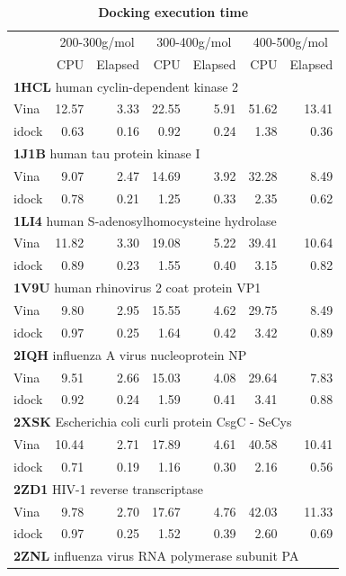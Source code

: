 \begin{table}[!ht]
\caption{
\bf{Docking execution time}}
\begin{tabular}{lrrrrrr}
\hline
& \multicolumn{2}{c}{200-300g/mol} & \multicolumn{2}{c}{300-400g/mol} & \multicolumn{2}{c}{400-500g/mol}\\
& CPU & Elapsed & CPU & Elapsed & CPU & Elapsed\\
\hline
\multicolumn{7}{l}{\textbf{1HCL} human cyclin-dependent kinase 2}\\
Vina  & 12.57 &  3.33 & 22.55 &  5.91 & 51.62 & 13.41\\
idock &  0.63 &  0.16 &  0.92 &  0.24 &  1.38 &  0.36\\
\multicolumn{7}{l}{\textbf{1J1B} human tau protein kinase I}\\
Vina  &  9.07 &  2.47 & 14.69 &  3.92 & 32.28 &  8.49\\
idock &  0.78 &  0.21 &  1.25 &  0.33 &  2.35 &  0.62\\
\multicolumn{7}{l}{\textbf{1LI4} human S-adenosylhomocysteine hydrolase}\\
Vina  & 11.82 &  3.30 & 19.08 &  5.22 & 39.41 & 10.64\\
idock &  0.89 &  0.23 &  1.55 &  0.40 &  3.15 &  0.82\\
\multicolumn{7}{l}{\textbf{1V9U} human rhinovirus 2 coat protein VP1}\\
Vina  &  9.80 &  2.95 & 15.55 &  4.62 & 29.75 &  8.49\\
idock &  0.97 &  0.25 &  1.64 &  0.42 &  3.42 &  0.89\\
\multicolumn{7}{l}{\textbf{2IQH} influenza A virus nucleoprotein NP}\\
Vina  &  9.51 &  2.66 & 15.03 &  4.08 & 29.64 &  7.83\\
idock &  0.92 &  0.24 &  1.59 &  0.41 &  3.41 &  0.88\\
\multicolumn{7}{l}{\textbf{2XSK} Escherichia coli curli protein CsgC - SeCys}\\
Vina  & 10.44 &  2.71 & 17.89 &  4.61 & 40.58 & 10.41\\
idock &  0.71 &  0.19 &  1.16 &  0.30 &  2.16 &  0.56\\
\multicolumn{7}{l}{\textbf{2ZD1} HIV-1 reverse transcriptase}\\
Vina  &  9.78 &  2.70 & 17.67 &  4.76 & 42.03 & 11.33\\
idock &  0.97 &  0.25 &  1.52 &  0.39 &  2.60 &  0.69\\
\multicolumn{7}{l}{\textbf{2ZNL} influenza virus RNA polymerase subunit PA}\\

\end{tabular}
\end{table}
